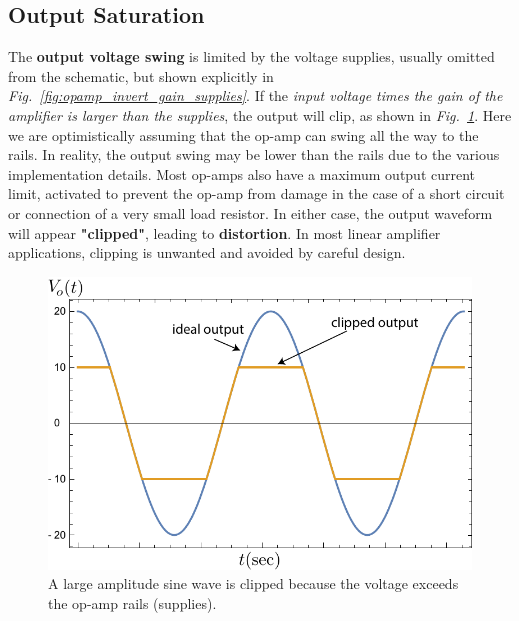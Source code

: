 \subsection{Output Saturation}
The \textbf{output voltage swing} is limited by the voltage supplies, usually omitted from the schematic, but shown explicitly in \emph{Fig.~\ref{fig:opamp_invert_gain_supplies}}.  If the \textit{input voltage times the gain of the amplifier is larger than the supplies}, the output will clip, as shown in \emph{Fig.~\ref{fig:sin_clip}}.  Here we are optimistically assuming that the op-amp can swing all the way to the rails.  In reality, the output swing may be lower than the rails due to the various implementation details.  Most op-amps also have a maximum output current limit, activated to prevent the op-amp from damage in the case of a short circuit or connection of a very small load resistor.  In either case, the output waveform will appear \textbf{"clipped"}, leading to \textbf{distortion}.  In most linear amplifier applications, clipping is unwanted and avoided by careful design.
\begin{figure}[H]
\centering
\includegraphics[width=.85\columnwidth]{sin_clip}
\caption{A large amplitude sine wave is clipped because the voltage exceeds the op-amp rails (supplies).}
\label{fig:sin_clip}
\end{figure}
\newpage
